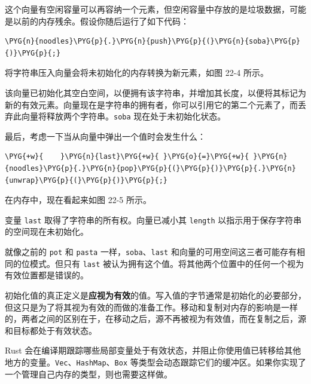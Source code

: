这个向量有空闲容量可以再容纳一个元素，但空闲容量中存放的是垃圾数据，可能是以前的内存残余。假设你随后运行了如下代码：

\begin{Verbatim}[commandchars=\\\{\},breaklines=true,breakanywhere=true,fontsize=\codefont,xleftmargin=17bp]
\PYG{n}{noodles}\PYG{p}{.}\PYG{n}{push}\PYG{p}{(}\PYG{n}{soba}\PYG{p}{)}\PYG{p}{;}
\end{Verbatim}

将字符串压入向量会将未初始化的内存转换为新元素，如图 22-4 所示。


该向量已初始化其空白空间，以便拥有该字符串，并增加其长度，以便将其标记为新的有效元素。向量现在是字符串的拥有者，你可以引用它的第二个元素了，而丢弃此向量将释放两个字符串。\texttt{soba} 现在处于未初始化状态。

最后，考虑一下当从向量中弹出一个值时会发生什么：

\begin{Verbatim}[commandchars=\\\{\},breaklines=true,breakanywhere=true,fontsize=\codefont,xleftmargin=17bp]
\PYG{+w}{    }\PYG{n}{last}\PYG{+w}{ }\PYG{o}{=}\PYG{+w}{ }\PYG{n}{noodles}\PYG{p}{.}\PYG{n}{pop}\PYG{p}{(}\PYG{p}{)}\PYG{p}{.}\PYG{n}{unwrap}\PYG{p}{(}\PYG{p}{)}\PYG{p}{;}
\end{Verbatim}

在内存中，现在看起来如图 22-5 所示。


变量 \texttt{last} 取得了字符串的所有权。向量已减小其 \texttt{length} 以指示用于保存字符串的空间现在未初始化。

就像之前的 \texttt{pot} 和 \texttt{pasta} 一样，\texttt{soba}、\texttt{last} 和向量的可用空间这三者可能存有相同的位模式。但只有 \texttt{last} 被认为拥有这个值。将其他两个位置中的任何一个视为有效位置都是错误的。

初始化值的真正定义是\textbf{应视为有效}的值。写入值的字节通常是初始化的必要部分，但这只是为了将其视为有效的而做的准备工作。移动和复制对内存的影响是一样的，两者之间的区别在于，在移动之后，源不再被视为有效值，而在复制之后，源和目标都处于有效状态。

Rust 会在编译期跟踪哪些局部变量处于有效状态，并阻止你使用值已转移给其他地方的变量。\texttt{Vec}、\texttt{HashMap}、\texttt{Box} 等类型会动态跟踪它们的缓冲区。如果你实现了一个管理自己内存的类型，则也需要这样做。


